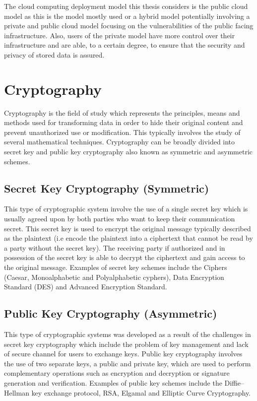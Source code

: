 The cloud computing deployment model this thesis considers is the public cloud model as this is the model mostly used or a hybrid model potentially involving a private and public cloud model focusing on the vulnerabilities of the public facing infrastructure. Also, users of the private model have more control over their infrastructure and are able, to a certain degree, to ensure that the security and privacy of stored data is assured.


\section{Cryptography}

Cryptography\cite{Kissel2013} is the field of study which represents the principles, means and methods used for transforming data in order to hide their original content and prevent unauthorized use or modification. This typically involves the study of several mathematical techniques. Cryptography can be broadly divided into secret key and public key cryptography also known as symmetric and asymmetric schemes.

\subsection{Secret Key Cryptography (Symmetric)} This type of cryptographic system involve the use of a single secret key which is usually agreed upon by both parties who want to keep their communication secret. This secret key is used to encrypt the original message typically described as the plaintext (i.e encode the plaintext into a ciphertext that cannot be read by a party without the secret key). The receiving party if authorized and in possession of the secret key is able to decrypt the ciphertext and gain access to the original message. Examples of secret key schemes include the Ciphers (Caesar, Monoalphabetic and Polyalphabetic cyphers), Data Encryption Standard (DES) and Advanced Encryption Standard. 

\subsection{Public Key Cryptography (Asymmetric)} This type of cryptographic systems was developed as a result of the challenges in secret key cryptography which include the problem of key management and lack of secure channel for users to exchange keys. Public key cryptography involves the use of two separate keys, a public and private key, which are used to perform complementary operations such as encryption and decryption or signature generation and verification. Examples of public key schemes include the Diffie–Hellman key exchange protocol, RSA, Elgamal and Elliptic Curve Cryptography.

